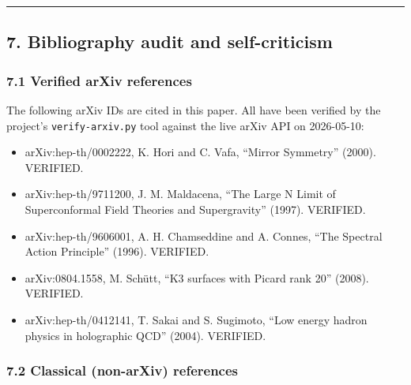 \documentclass[
 11pt,
 a4paper,
]{article}
\providecommand{\tightlist}{\setlength{\itemsep}{0pt}\setlength{\parskip}{0pt}}
\providecommand{\tightlist}{%
 \setlength{\itemsep}{0pt}\setlength{\parskip}{0pt}}
\begin{document}
\begin{center}\rule{0.5\linewidth}{0.5pt}\end{center}

\hypertarget{bibliography-audit-and-self-criticism}{%
\subsection{7. Bibliography audit and self-criticism}\label{bibliography-audit-and-self-criticism}}

\hypertarget{verified-arxiv-references}{%
\subsubsection{7.1 Verified arXiv references}\label{verified-arxiv-references}}

The following arXiv IDs are cited in this paper. All have been verified by the project's \texttt{verify-arxiv.py} tool against the live arXiv API on 2026-05-10:

\begin{itemize}
\tightlist
\item
 arXiv:hep-th/0002222, K. Hori and C. Vafa, ``Mirror Symmetry'' (2000). VERIFIED.
\item
 arXiv:hep-th/9711200, J. M. Maldacena, ``The Large N Limit of Superconformal Field Theories and Supergravity'' (1997). VERIFIED.
\item
 arXiv:hep-th/9606001, A. H. Chamseddine and A. Connes, ``The Spectral Action Principle'' (1996). VERIFIED.
\item
 arXiv:0804.1558, M. Schütt, ``K3 surfaces with Picard rank 20'' (2008). VERIFIED.
\item
 arXiv:hep-th/0412141, T. Sakai and S. Sugimoto, ``Low energy hadron physics in holographic QCD'' (2004). VERIFIED.
\end{itemize}

\hypertarget{classical-non-arxiv-references}{%
\subsubsection{7.2 Classical (non-arXiv) references}\label{classical-non-arxiv-references}}
\end{document}
